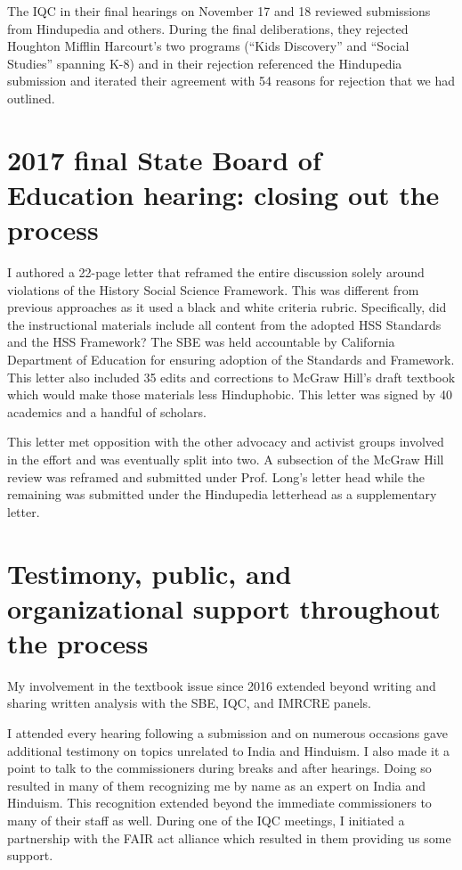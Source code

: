 The IQC in their final hearings on November 17 and 18 reviewed submissions from Hindupedia and others. During the final deliberations, they rejected Houghton Mifflin Harcourt’s two programs (“Kids Discovery” and “Social Studies” spanning K-8) and in their rejection referenced the Hindupedia submission and iterated their agreement with 54 reasons for rejection that we had outlined. 


\section*{2017 final State Board of Education hearing: closing out the process}

I authored a 22-page letter that reframed the entire discussion solely around violations of the History Social Science Framework. This was different from previous approaches as it used a black and white criteria rubric. Specifically, did the instructional materials include all content from the adopted HSS Standards and the HSS Framework? The SBE was held accountable by California Department of Education for ensuring adoption of the Standards and Framework. This letter also included 35 edits and corrections to McGraw Hill’s draft textbook which would make those materials less Hinduphobic. This letter was signed by 40 academics and a handful of scholars. 

This letter met opposition with the other advocacy and activist groups involved in the effort and was eventually split into two. A subsection of the McGraw Hill review was reframed and submitted under Prof. Long’s letter head while the remaining was submitted under the Hindupedia letterhead as a supplementary letter.


\section*{Testimony, public, and organizational support throughout the process}

My involvement in the textbook issue since 2016 extended beyond writing and sharing written analysis with the SBE, IQC, and IMRCRE panels. 

I attended every hearing following a submission and on numerous occasions gave additional testimony on topics unrelated to India and Hinduism. I also made it a point to talk to the commissioners during breaks and after hearings. Doing so resulted in many of them recognizing me by name as an expert on India and Hinduism. This recognition extended beyond the immediate commissioners to many of their staff as well. During one of the IQC meetings, I initiated a partnership with the FAIR act alliance which resulted in them providing us some support.

